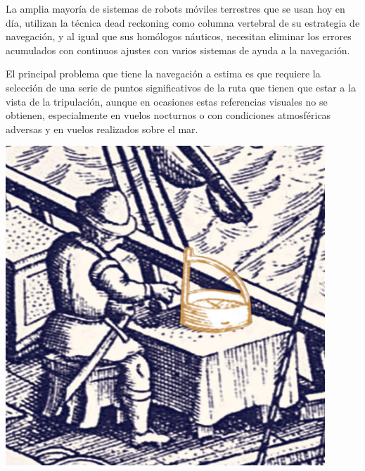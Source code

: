   \begin{minipage}[b]{0.650\linewidth}
  

  La amplia mayor\'ia de sistemas de robots m\'oviles terrestres que
  se usan hoy en d\'ia, utilizan la t\'ecnica dead reckoning como
  columna vertebral de su estrategia de navegaci\'on, y al igual que
  sus hom\'ologos n\'auticos, necesitan eliminar los errores
  acumulados con continuos ajustes con varios sistemas de ayuda a la
  navegaci\'on.


  El principal problema que tiene la navegaci\'on a estima es que
  requiere la selecci\'on de una serie de puntos significativos de la
  ruta que tienen que estar
 a la vista de la tripulaci\'on, aunque en
  ocasiones estas referencias visuales no se obtienen, especialmente
  en vuelos nocturnos o con condiciones atmosf\'ericas adversas y en
  vuelos realizados sobre el mar.

\end{minipage}
\begin{minipage}[b]{0.35\linewidth}
    \centering
    
     \includegraphics[width=0.90\textwidth]{Imagenes/06.00.navegacion/marinero-navegacion.jpg}
   \end{minipage}
  
